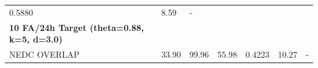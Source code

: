 \documentclass[
]{article}
\begin{document}
\begin{longtable}[]{@{}lllllll@{}}
\begin{minipage}[t]{0.12\columnwidth}
0.5880\strut
\end{minipage} & \begin{minipage}[t]{0.12\columnwidth}\raggedright
8.59\strut
\end{minipage} & \begin{minipage}[t]{0.12\columnwidth}\raggedright
-\strut
\end{minipage}\tabularnewline
\begin{minipage}[t]{0.12\columnwidth}\raggedright
\textbf{10 FA/24h Target (theta=0.88, k=5, d=3.0)}\strut
\end{minipage} & \begin{minipage}[t]{0.12\columnwidth}\raggedright
\strut
\end{minipage} & \begin{minipage}[t]{0.12\columnwidth}\raggedright
\strut
\end{minipage} & \begin{minipage}[t]{0.12\columnwidth}\raggedright
\strut
\end{minipage} & \begin{minipage}[t]{0.12\columnwidth}\raggedright
\strut
\end{minipage} & \begin{minipage}[t]{0.12\columnwidth}\raggedright
\strut
\end{minipage} & \begin{minipage}[t]{0.12\columnwidth}\raggedright
\strut
\end{minipage}\tabularnewline
\begin{minipage}[t]{0.12\columnwidth}\raggedright
NEDC OVERLAP\strut
\end{minipage} & \begin{minipage}[t]{0.12\columnwidth}\raggedright
33.90\strut
\end{minipage} & \begin{minipage}[t]{0.12\columnwidth}\raggedright
99.96\strut
\end{minipage} & \begin{minipage}[t]{0.12\columnwidth}\raggedright
55.98\strut
\end{minipage} & \begin{minipage}[t]{0.12\columnwidth}\raggedright
0.4223\strut
\end{minipage} & \begin{minipage}[t]{0.12\columnwidth}\raggedright
10.27\strut
\end{minipage} & \begin{minipage}[t]{0.12\columnwidth}\raggedright
-\strut
\end{minipage}\tabularnewline

\end{longtable}
\end{document}

